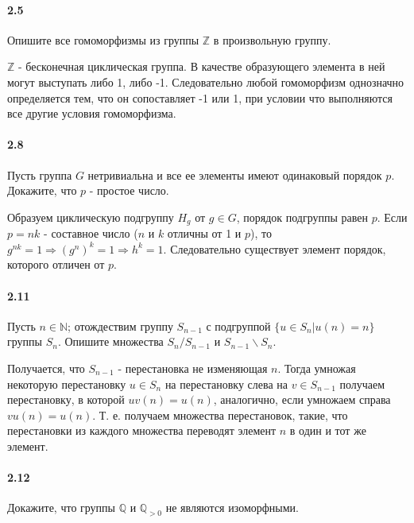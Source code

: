 \documentclass[a4paper,12pt]{article}
\begin{document}
\paragraph{2.5} Опишите все гомоморфизмы из группы $\mathbb{Z}$ в произвольную группу.

\begin{Solution}
$\mathbb{Z}$ - бесконечная циклическая группа. В качестве образующего элемента в ней могут выступать либо 1, либо -1. Следовательно любой гомоморфизм однозначно определяется тем, что он сопоставляет -1 или 1, при условии что выполняются все другие условия гомоморфизма.
\end{Solution}

\paragraph{2.8} Пусть группа $G$ нетривиальна и все ее элементы имеют одинаковый порядок $p$. Докажите, что $p$ - простое число.

\begin{Solution}
Образуем циклическую подгруппу $H_g$ от $g \in G$, порядок подгруппы равен $p$. Если $p = nk$ - составное число ($n$ и $k$ отличны от 1 и $p$), то $g^{nk} = 1 \Rightarrow (g^n)^k = 1 \Rightarrow h^k = 1$. Следовательно существует элемент порядок, которого отличен от $p$.
\end{Solution}

\paragraph{2.11} Пусть $n \in \mathbb{N}$; отождествим группу $S_{n-1}$ с подгруппой $\{u \in S_n | u(n) = n\}$ группы $S_n$. Опишите множества $S_n/S_{n-1}$ и $S_{n-1} \backslash S_{n}$.

\begin{Solution}
Получается, что $S_{n-1}$ - перестановка не изменяющая $n$. Тогда умножая некоторую перестановку $u \in S_n$ на перестановку слева на $v \in S_{n-1}$ получаем перестановку, в которой $uv(n) = u(n)$, аналогично, если умножаем справа $vu(n) = u(n)$. Т. е. получаем множества перестановок, такие, что перестановки из каждого множества переводят элемент $n$ в один и тот же элемент.
\end{Solution}

\paragraph{2.12} Докажите, что группы $\mathbb{Q}$ и $\mathbb{Q}_{>0}$ не являются изоморфными.
\end{document}
